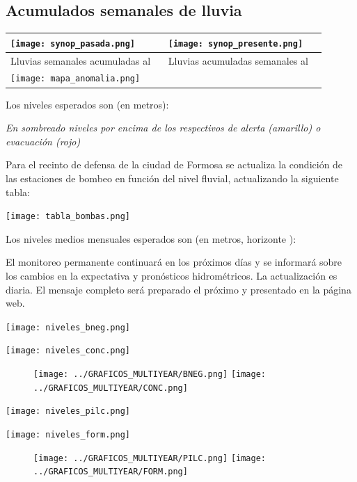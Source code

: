 \documentclass[11pt,spanish] {article}
\DeclareRobustCommand{\fechaformat}{}
\DeclareRobustCommand{\fechapasada}{}
\DeclareRobustCommand{\pronodiariocomentario}{}
\DeclareRobustCommand{\comentariofinal}{}
\DeclareRobustCommand{\fechaproximo}{}
\DeclareRobustCommand{\textoanomalia}{}
\DeclareRobustCommand{\pronodiario}{}
\DeclareRobustCommand{\pronomensual}{}
\DeclareRobustCommand{\horizonte}{}
\begin{document}
\subsection{Acumulados semanales de lluvia}
\begin{tabular}{|p{0.45\linewidth}|p{0.45\linewidth}|}
	\hline
	\texttt{[image: synop\_pasada.png]} & \texttt{[image: synop\_presente.png]} \\
	\hline
	Lluvias semanales acumuladas al \fechapasada & Lluvias acumuladas semanales al \fechaformat \\
	\hline
	\texttt{[image: mapa\_anomalia.png]} & \textoanomalia \\
	\hline
\end{tabular}

\begin{minipage}{\textwidth}
Los niveles esperados son (en metros):

\begin{center}

\pronodiario

\emph{En sombreado niveles por encima de los respectivos de alerta (amarillo) o evacuación (rojo)}
\end{center}
\end{minipage}

\pronodiariocomentario

Para el recinto de defensa de la ciudad de Formosa se actualiza la condición de las estaciones
de bombeo en función del nivel fluvial, actualizando la siguiente tabla:
\begin{center}
\texttt{[image: tabla\_bombas.png]}
\end{center}
Los niveles medios mensuales esperados son (en metros, horizonte \horizonte):
\begin{center}
\pronomensual
\end{center}
\comentariofinal

El monitoreo permanente continuará en los próximos días y se informará sobre los cambios en la
expectativa y pronósticos hidrométricos. La actualización es diaria. El mensaje completo será
preparado el próximo \emph{\fechaproximo} y presentado en la página web.

\pagebreak
\begin{center}
\texttt{[image: niveles\_bneg.png]}

\texttt{[image: niveles\_conc.png]}

\begin{figure}[b]
	\texttt{[image: ../GRAFICOS\_MULTIYEAR/BNEG.png]}
	\texttt{[image: ../GRAFICOS\_MULTIYEAR/CONC.png]}
\end{figure}

\texttt{[image: niveles\_pilc.png]}

\texttt{[image: niveles\_form.png]}

\begin{figure}[b]
	\texttt{[image: ../GRAFICOS\_MULTIYEAR/PILC.png]}
	\texttt{[image: ../GRAFICOS\_MULTIYEAR/FORM.png]}
\end{figure}

\end{center}
\end{document}
